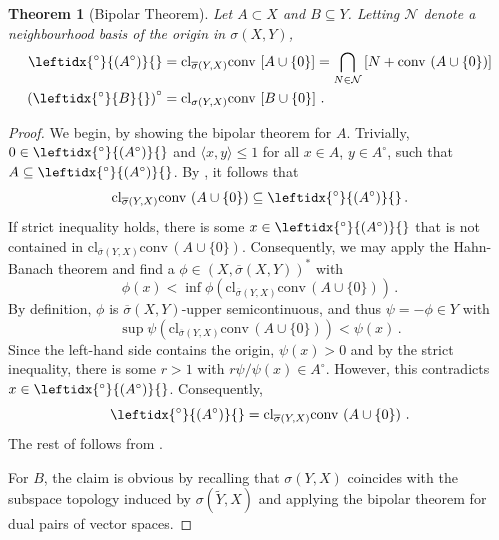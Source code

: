 \documentclass[
	paper=A4,
	pagesize=auto,
	fontsize=12pt
]{scrartcl}
\theoremstyle{plain}
\newtheorem{theorem}{Theorem}[section]
\theoremstyle{remark}
\theoremstyle{definition}
\begin{document}
\begin{theorem}[Bipolar Theorem]
\label{thm:bipolar}
Let $A \subset X$ and $B \subseteq Y$.
Letting $\mathcal{N}$ denote a neighbourhood basis of the origin in $\sigma(X, Y)$,
%
\begin{align}
\label{eq:BipolarWeakConjugateClosureRep}
\leftidx{^\circ}{\left( A^\circ \right)}{}
&=
\mathrm{cl}_{\overline{\sigma}(Y,X)} \mathrm{conv}\, \left[ A \cup \{ 0 \} \right]
=
\bigcap_{N \in \mathcal{N}} \left[ N + \mathrm{conv}\, \left( A \cup \{ 0 \} \right) \right]
\\
\left( \leftidx{^\circ}{B}{} \right)^\circ
&=
\mathrm{cl}_{\sigma(Y,X)} \mathrm{conv}\, \left[ B \cup \{ 0 \} \right] \, .
\end{align}
\end{theorem}
\begin{proof}
We begin, by showing the bipolar theorem for $A$.
Trivially, $0 \in \leftidx{^\circ}{( A^\circ )}{}$ and $\langle x, y \rangle \le 1$ for all $x \in A$, $y \in A^\circ$, such that $A \subseteq \leftidx{^\circ}{( A^\circ )}{}$.
By , it follows that
%
\begin{equation}
\mathrm{cl}_{\overline{\sigma}(Y,X)} \mathrm{conv}\, \left( A \cup \{ 0 \} \right)
\subseteq
\leftidx{^\circ}{\left( A^\circ \right)}{} \, .
\end{equation}
%
If strict inequality holds, there is some $x \in \leftidx{^\circ}{( A^\circ )}{}$ that is not contained in $\mathrm{cl}_{\overline{\sigma}(Y,X)} \mathrm{conv}\, ( A \cup \{ 0 \} )$.
Consequently, we may apply the Hahn-Banach theorem \cite[Theorem 2.2.9]{src:Cobzaş:FunctionalAnalysisinAsymmetricNormedSpaces} and find a $\phi \in (X, \overline{\sigma}(X, Y))^*$ with
%
\begin{equation}
\phi \left( x \right)
<
\inf \phi \left( \mathrm{cl}_{\overline{\sigma}(Y,X)} \mathrm{conv}\, ( A \cup \{ 0 \} ) \right) \, .
\end{equation}
%
By definition, $\phi$ is $\overline{\sigma}(X, Y)$-upper semicontinuous, and thus $\psi = -\phi \in Y$ with
%
\begin{equation}
\sup \psi \left( \mathrm{cl}_{\overline{\sigma}(Y,X)} \mathrm{conv}\, ( A \cup \{ 0 \} ) \right)
<
\psi \left( x \right) \, .
\end{equation}
%
Since the left-hand side contains the origin, $\psi(x) > 0$ and by the strict inequality, there is some $r > 1$ with $r \psi / \psi(x) \in A^\circ$.
However, this contradicts $x \in \leftidx{^\circ}{( A^\circ )}{}$.
Consequently,
%
\begin{equation}
\leftidx{^\circ}{\left( A^\circ \right)}{}
=
\mathrm{cl}_{\overline{\sigma}(Y,X)} \mathrm{conv}\, \left( A \cup \{ 0 \} \right) \, .
\end{equation}
%
The rest of  follows from .

For $B$, the claim is obvious by recalling that $\sigma(Y, X)$ coincides with the subspace topology induced by $\sigma(\widetilde{Y}, X)$ and applying the bipolar theorem for dual pairs of vector spaces. 
\end{proof}
\end{document}
